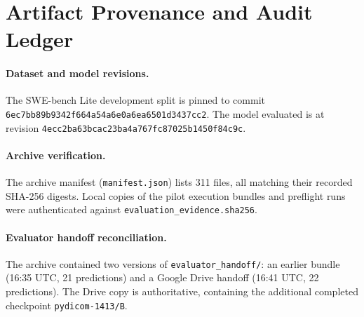 \documentclass[11pt]{article}
\begin{document}
\clearpage
\appendix
\section{Artifact Provenance and Audit Ledger}

\paragraph{Dataset and model revisions.}
The SWE-bench Lite development split is pinned to commit
\texttt{6ec7bb8}\allowbreak\texttt{9b9342f6}\allowbreak\texttt{64a54a6e}\allowbreak\texttt{0a6ea650}\allowbreak\texttt{1d3437cc2}.
The model evaluated is  at revision
\texttt{4ecc2ba}\allowbreak\texttt{63bcac23}\allowbreak\texttt{ba4a767f}\allowbreak\texttt{c87025b1}\allowbreak\texttt{450f84c9c}.

\paragraph{Archive verification.}
The archive manifest (\texttt{manifest.json}) lists 311 files, all matching
their recorded SHA-256 digests.  Local copies of the pilot execution bundles
and preflight runs were authenticated against \texttt{evaluation\_evidence.sha256}.

\paragraph{Evaluator handoff reconciliation.}
The archive contained two versions of \texttt{evaluator\_handoff/}: an
earlier bundle (16:35 UTC, 21 predictions) and a Google Drive handoff
(16:41 UTC, 22 predictions).  The Drive copy is authoritative, containing
the additional completed checkpoint \texttt{pydicom-1413/B}.



\end{document}
